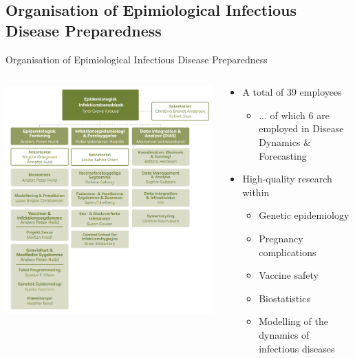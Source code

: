\documentclass[aspectratio=169]{beamer}
\begin{document}
\hypertarget{organisation-of-epimiological-infectious-disease-preparedness}{%
\subsection{Organisation of Epimiological Infectious Disease
Preparedness}\label{organisation-of-epimiological-infectious-disease-preparedness}}

\begin{frame}{Organisation of Epimiological Infectious Disease
Preparedness}
\begin{columns}
\begin{column}{.48\textwidth}

 \tiny


\includegraphics[width=0.9\linewidth]{../figures/epi_inf_disease_preparedness} 

 \normalsize
\end{column}
\begin{column}{.48\textwidth}
\begin{itemize}
  \item A total of 39 employees
  \begin{itemize}
    \item ... of which 6 are employed in Disease Dynamics \& Forecasting
  \end{itemize}
  \item High-quality research within
  \begin{itemize}
    \item Genetic epidemiology
    \item Pregnancy complications
    \item Vaccine safety
    \item Biostatistics
    \item Modelling of the dynamics of infectious diseases
  \end{itemize}
\end{itemize}
\end{column}
\end{columns}
\end{frame}
\end{document}
